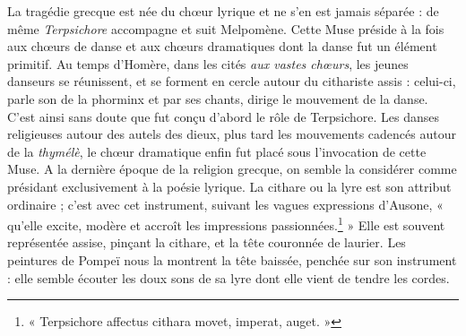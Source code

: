 \documentclass[landscape, a4paper, 11pt, oneside, polutonikogreek, french]{article}
\begin{document}
La tragédie grecque est née du chœur lyrique et ne s'en est jamais séparée : de même \emph{Terpsichore} accompagne et suit Melpomène. Cette Muse préside à la fois aux chœurs de danse et aux chœurs dramatiques dont la danse fut un élément primitif. Au temps d'Homère, dans les cités \emph{aux vastes chœurs}, les jeunes danseurs se réunissent, et se forment en cercle autour du cithariste assis : celui-ci, parle son de la phorminx et par ses chants, dirige le mouvement de la danse. C'est ainsi sans doute que fut conçu d'abord le rôle de Terpsichore. Les danses religieuses autour des autels des dieux, plus tard les mouvements cadencés autour de la \emph{thymélè}, le chœur dramatique enfin fut placé sous l'invocation de cette Muse. A la dernière époque de la religion grecque, on semble la considérer comme présidant exclusivement à la poésie lyrique. La cithare ou la lyre est son attribut ordinaire ; c'est avec cet instrument, suivant les vagues expressions d'Ausone, « qu'elle excite, modère et accroît les impressions passionnées.\footnote{« Terpsichore affectus cithara movet, imperat, auget. »} » Elle est souvent représentée assise, pinçant la cithare, et la tête couronnée de laurier. Les peintures de Pompeï nous la montrent la tête baissée, penchée sur son instrument : elle semble écouter les doux sons de sa lyre dont elle vient de tendre les cordes.
\end{document}
